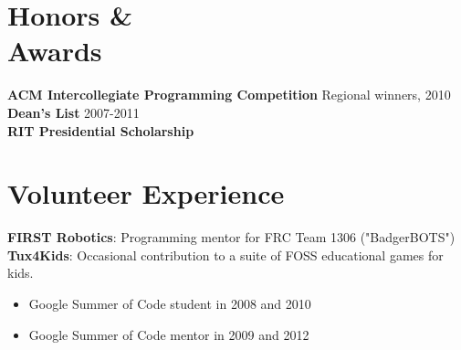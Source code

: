 \documentclass[line,margin]{res}
\begin{document}
\begin{resume}
\section{\sc Honors \& \\ Awards}          
    \textbf{ACM Intercollegiate Programming Competition} \hfill Regional winners, 2010              \\
    \textbf{Dean's List} \hfill                                              2007-2011              \\
    \textbf{RIT Presidential Scholarship}                                                           
 
\section{\sc Volunteer Experience}          
    \textbf{FIRST Robotics}: Programming mentor for FRC Team 1306 ("BadgerBOTS") \\
    \textbf{Tux4Kids}: Occasional contribution to a suite of FOSS educational games for kids.
    \begin{itemize}
        \item Google Summer of Code student in 2008 and 2010 
        \item Google Summer of Code mentor in 2009 and 2012
    \end{itemize}

\end{resume}
\end{document}
